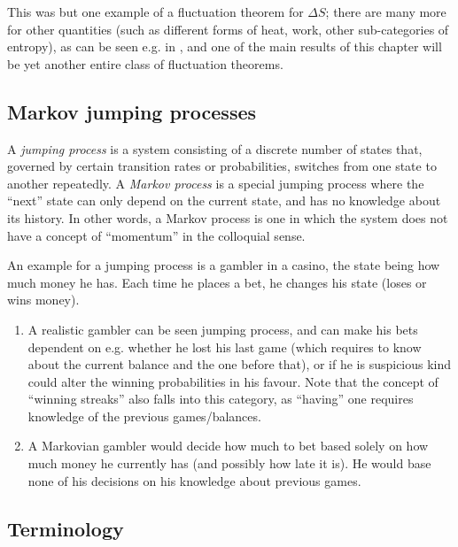 This was but one example of a fluctuation theorem for \(\Delta S\); there are many more for other quantities (such as different forms of heat, work, other sub-categories of entropy), as can be seen e.g. in \cite{seifert-review}, and one of the main results of this chapter will be yet another entire class of fluctuation theorems.


\subsection{Markov jumping processes}
\label{sec:markov process}

A \emph{jumping process} is a system consisting of a discrete number of states that, governed by certain transition rates or probabilities, switches from one state to another repeatedly. A \emph{Markov process} is a special jumping process where the ``next'' state can only depend on the current state, and has no knowledge about its history. In other words, a Markov process is one in which the system does not have a concept of ``momentum'' in the colloquial sense.

An example for a jumping process is a gambler in a casino, the state being how much money he has. Each time he places a bet, he changes his state (loses or wins money).
%
\begin{enumerate}
	\item A realistic gambler can be seen jumping process, and can make his bets dependent on e.g. whether he lost his last game (which requires to know about the current balance and the one before that), or if he is suspicious kind could alter the winning probabilities in his favour. Note that the concept of ``winning streaks'' also falls into this category, as ``having'' one requires knowledge of the previous games/balances.
	\item A Markovian gambler would decide how much to bet based solely on how much money he currently has (and possibly how late it is). He would base none of his decisions on his knowledge about previous games.
\end{enumerate}






\subsection{Terminology}

